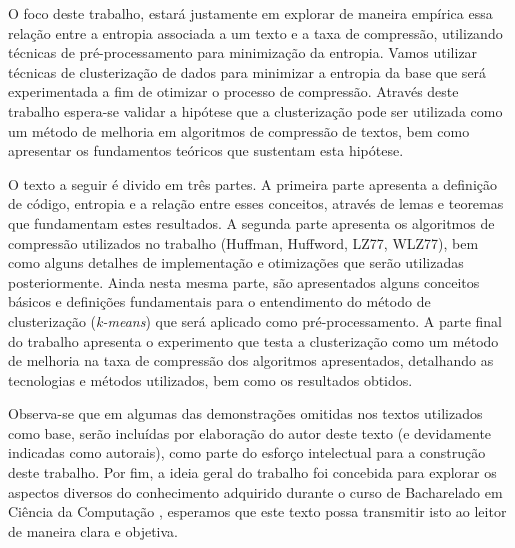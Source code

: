 O foco deste trabalho, estará justamente em explorar de maneira empírica essa relação entre a entropia associada a um texto e a taxa de compressão, utilizando técnicas de pré-processamento para minimização da entropia. 
Vamos utilizar técnicas de clusterização de dados para minimizar a entropia da base que será experimentada a fim de otimizar o processo de compressão.
Através deste trabalho espera-se validar a hipótese que a clusterização pode ser utilizada como um método de melhoria em algoritmos de compressão de textos, bem como apresentar os fundamentos teóricos que sustentam esta hipótese.

O texto a seguir é divido em três partes.
 A primeira parte apresenta a definição de código, entropia e a relação entre esses conceitos, através de lemas e teoremas que fundamentam estes resultados.
 A segunda parte apresenta os algoritmos de compressão utilizados no trabalho (Huffman, Huffword, LZ77, WLZ77), bem como alguns detalhes de implementação e otimizações que serão utilizadas posteriormente.
 Ainda nesta mesma parte, são apresentados alguns conceitos básicos e definições fundamentais para o entendimento do método de clusterização (\emph{k-means}) que será aplicado como pré-processamento.
 A parte final do trabalho apresenta o experimento que testa a clusterização como um método de melhoria na taxa de compressão dos algoritmos apresentados, detalhando as tecnologias e métodos utilizados, bem como os resultados obtidos.
 
 Observa-se que em algumas das demonstrações omitidas nos textos utilizados como base, serão incluídas por elaboração do autor deste texto (e devidamente indicadas como autorais), como parte do esforço intelectual para a construção deste trabalho.
 Por fim, a ideia geral do trabalho foi concebida para explorar os aspectos diversos do conhecimento adquirido durante o curso de Bacharelado em Ciência da Computação , esperamos que este texto possa transmitir isto ao leitor de maneira clara e objetiva.
 
 